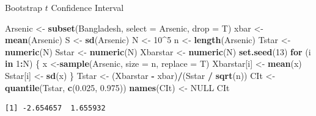 \documentclass[
  ignorenonframetext,
]{beamer}
\newenvironment{Shaded}{\begin{snugshade}}{\end{snugshade}}
\newcommand{\AttributeTok}[1]{\textcolor[rgb]{0.13,0.29,0.53}{#1}}
\newcommand{\ConstantTok}[1]{\textcolor[rgb]{0.56,0.35,0.01}{#1}}
\newcommand{\ControlFlowTok}[1]{\textcolor[rgb]{0.13,0.29,0.53}{\textbf{#1}}}
\newcommand{\DecValTok}[1]{\textcolor[rgb]{0.00,0.00,0.81}{#1}}
\newcommand{\FloatTok}[1]{\textcolor[rgb]{0.00,0.00,0.81}{#1}}
\newcommand{\FunctionTok}[1]{\textcolor[rgb]{0.13,0.29,0.53}{\textbf{#1}}}
\newcommand{\NormalTok}[1]{#1}
\newcommand{\OtherTok}[1]{\textcolor[rgb]{0.56,0.35,0.01}{#1}}
\newcommand{\SpecialCharTok}[1]{\textcolor[rgb]{0.81,0.36,0.00}{\textbf{#1}}}
\begin{document}
\begin{frame}[fragile]{Bootstrap \(t\) Confidence Interval}
\protect\hypertarget{bootstrap-t-confidence-interval-4}{}
\tiny

\begin{Shaded}
\begin{Highlighting}[]
\NormalTok{Arsenic }\OtherTok{\textless{}{-}} \FunctionTok{subset}\NormalTok{(Bangladesh, }\AttributeTok{select =}\NormalTok{ Arsenic, }\AttributeTok{drop =}\NormalTok{ T)}
\NormalTok{xbar }\OtherTok{\textless{}{-}} \FunctionTok{mean}\NormalTok{(Arsenic)}
\NormalTok{S }\OtherTok{\textless{}{-}} \FunctionTok{sd}\NormalTok{(Arsenic)}
\NormalTok{N }\OtherTok{\textless{}{-}} \DecValTok{10}\SpecialCharTok{\^{}}\DecValTok{5}
\NormalTok{n }\OtherTok{\textless{}{-}} \FunctionTok{length}\NormalTok{(Arsenic)}
\NormalTok{Tstar }\OtherTok{\textless{}{-}} \FunctionTok{numeric}\NormalTok{(N)}
\NormalTok{Sstar }\OtherTok{\textless{}{-}} \FunctionTok{numeric}\NormalTok{(N)}
\NormalTok{Xbarstar }\OtherTok{\textless{}{-}} \FunctionTok{numeric}\NormalTok{(N)}
\FunctionTok{set.seed}\NormalTok{(}\DecValTok{13}\NormalTok{)}
\ControlFlowTok{for}\NormalTok{ (i }\ControlFlowTok{in} \DecValTok{1}\SpecialCharTok{:}\NormalTok{N)}
\NormalTok{\{}
\NormalTok{  x }\OtherTok{\textless{}{-}}\FunctionTok{sample}\NormalTok{(Arsenic, }\AttributeTok{size =}\NormalTok{ n, }\AttributeTok{replace =}\NormalTok{ T)}
\NormalTok{  Xbarstar[i] }\OtherTok{\textless{}{-}} \FunctionTok{mean}\NormalTok{(x)}
\NormalTok{  Sstar[i] }\OtherTok{\textless{}{-}} \FunctionTok{sd}\NormalTok{(x)}
\NormalTok{\}}
\NormalTok{Tstar }\OtherTok{\textless{}{-}}\NormalTok{ (Xbarstar }\SpecialCharTok{{-}}\NormalTok{ xbar)}\SpecialCharTok{/}\NormalTok{(Sstar }\SpecialCharTok{/} \FunctionTok{sqrt}\NormalTok{(n))}
\NormalTok{CIt }\OtherTok{\textless{}{-}} \FunctionTok{quantile}\NormalTok{(Tstar, }\FunctionTok{c}\NormalTok{(}\FloatTok{0.025}\NormalTok{, }\FloatTok{0.975}\NormalTok{))}
\FunctionTok{names}\NormalTok{(CIt) }\OtherTok{\textless{}{-}} \ConstantTok{NULL}
\NormalTok{CIt}
\end{Highlighting}
\end{Shaded}

\begin{verbatim}
[1] -2.654657  1.655932
\end{verbatim}

\normalsize
\end{frame}
\end{document}
